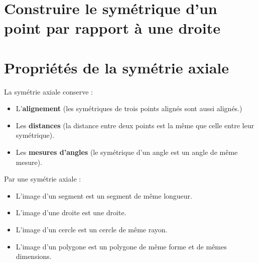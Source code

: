 \begin{pageAD}



 


\end{pageAD}

\begin{pageCours}

\section{Construire le symétrique d'un point par rapport à une droite}

\begin{Mt}
\end{Mt}

\section{Propriétés de la symétrie axiale}

 
\begin{Pp}
La symétrie axiale conserve :
\begin{itemize}
\item L'\textbf{alignement} (les symétriques de trois points alignés sont aussi alignés.)
\item Les \textbf{distances} (la distance entre deux points est la même que celle entre leur symétrique).
\item Les \textbf{mesures d'angles} (le symétrique d'un angle est un angle de même mesure).
\end{itemize}
\end{Pp} 
 
\begin{Cq}
Par une symétrie axiale : 
\begin{itemize}
\item L'image d'un segment est un segment de même longueur.
\item L'image d'une droite est une droite.
\item L'image d'un cercle est un cercle de même rayon.
\item L'image d'un polygone est un polygone de même forme et de mêmes dimensions.
\end{itemize}
\end{Cq} 


\end{pageCours}
